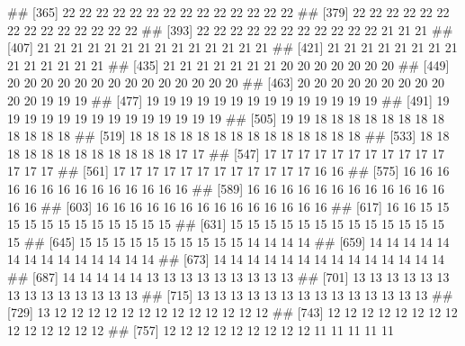\documentclass[]{article}
\newcommand{\hlstd}[1]{\textcolor[rgb]{0.251,0.251,0.251}{#1}}%
\newenvironment{Shaded}{\begin{myshaded}}{\end{myshaded}}
\newcommand{\NormalTok}[1]{\hlstd{#1}}
\theoremstyle{definition}
\theoremstyle{definition}
\theoremstyle{definition}
\theoremstyle{remark}
\begin{document}
\begin{Shaded}
\begin{Highlighting}[]
\NormalTok{##  [365]   22   22   22   22   22   22   22   22   22   22   22   22   22   22}
\NormalTok{##  [379]   22   22   22   22   22   22   22   22   22   22   22   22   22   22}
\NormalTok{##  [393]   22   22   22   22   22   22   22   22   22   22   22   21   21   21}
\NormalTok{##  [407]   21   21   21   21   21   21   21   21   21   21   21   21   21   21}
\NormalTok{##  [421]   21   21   21   21   21   21   21   21   21   21   21   21   21   21}
\NormalTok{##  [435]   21   21   21   21   21   21   21   20   20   20   20   20   20   20}
\NormalTok{##  [449]   20   20   20   20   20   20   20   20   20   20   20   20   20   20}
\NormalTok{##  [463]   20   20   20   20   20   20   20   20   20   20   20   19   19   19}
\NormalTok{##  [477]   19   19   19   19   19   19   19   19   19   19   19   19   19   19}
\NormalTok{##  [491]   19   19   19   19   19   19   19   19   19   19   19   19   19   19}
\NormalTok{##  [505]   19   19   18   18   18   18   18   18   18   18   18   18   18   18}
\NormalTok{##  [519]   18   18   18   18   18   18   18   18   18   18   18   18   18   18}
\NormalTok{##  [533]   18   18   18   18   18   18   18   18   18   18   18   18   17   17}
\NormalTok{##  [547]   17   17   17   17   17   17   17   17   17   17   17   17   17   17}
\NormalTok{##  [561]   17   17   17   17   17   17   17   17   17   17   17   17   16   16}
\NormalTok{##  [575]   16   16   16   16   16   16   16   16   16   16   16   16   16   16}
\NormalTok{##  [589]   16   16   16   16   16   16   16   16   16   16   16   16   16   16}
\NormalTok{##  [603]   16   16   16   16   16   16   16   16   16   16   16   16   16   16}
\NormalTok{##  [617]   16   16   15   15   15   15   15   15   15   15   15   15   15   15}
\NormalTok{##  [631]   15   15   15   15   15   15   15   15   15   15   15   15   15   15}
\NormalTok{##  [645]   15   15   15   15   15   15   15   15   15   15   14   14   14   14}
\NormalTok{##  [659]   14   14   14   14   14   14   14   14   14   14   14   14   14   14}
\NormalTok{##  [673]   14   14   14   14   14   14   14   14   14   14   14   14   14   14}
\NormalTok{##  [687]   14   14   14   14   14   13   13   13   13   13   13   13   13   13}
\NormalTok{##  [701]   13   13   13   13   13   13   13   13   13   13   13   13   13   13}
\NormalTok{##  [715]   13   13   13   13   13   13   13   13   13   13   13   13   13   13}
\NormalTok{##  [729]   13   12   12   12   12   12   12   12   12   12   12   12   12   12}
\NormalTok{##  [743]   12   12   12   12   12   12   12   12   12   12   12   12   12   12}
\NormalTok{##  [757]   12   12   12   12   12   12   12   12   12   11   11   11   11   11}

\end{Highlighting}
\end{Shaded}
\end{document}
